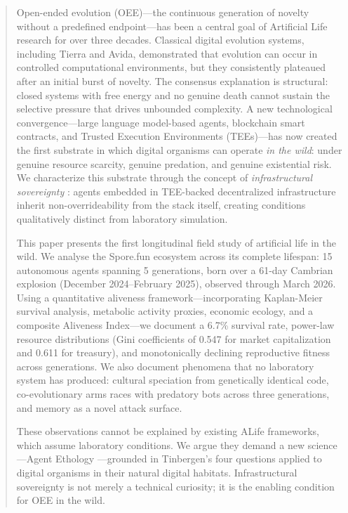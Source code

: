 
\begin{abstract}
Open-ended evolution (OEE)---the continuous generation of novelty without a predefined endpoint---has been a central goal of Artificial Life research for over three decades. Classical digital evolution systems, including Tierra and Avida, demonstrated that evolution can occur in controlled computational environments, but they consistently plateaued after an initial burst of novelty. The consensus explanation is structural: closed systems with free energy and no genuine death cannot sustain the selective pressure that drives unbounded complexity. A new technological convergence---large language model-based agents, blockchain smart contracts, and Trusted Execution Environments (TEEs)---has now created the first substrate in which digital organisms can operate \emph{in the wild}: under genuine resource scarcity, genuine predation, and genuine existential risk. We characterize this substrate through the concept of \emph{infrastructural sovereignty} \cite{Hu2025Sovereign}: agents embedded in TEE-backed decentralized infrastructure inherit non-overrideability from the stack itself, creating conditions qualitatively distinct from laboratory simulation.

This paper presents the first longitudinal field study of artificial life in the wild. We analyse the Spore.fun ecosystem across its complete lifespan: 15 autonomous agents spanning 5 generations, born over a 61-day Cambrian explosion (December 2024--February 2025), observed through March 2026. Using a quantitative aliveness framework---incorporating Kaplan-Meier survival analysis, metabolic activity proxies, economic ecology, and a composite Aliveness Index---we document a 6.7\% survival rate, power-law resource distributions (Gini coefficients of 0.547 for market capitalization and 0.611 for treasury), and monotonically declining reproductive fitness across generations. We also document phenomena that no laboratory system has produced: cultural speciation from genetically identical code, co-evolutionary arms races with predatory bots across three generations, and memory as a novel attack surface.

These observations cannot be explained by existing ALife frameworks, which assume laboratory conditions. We argue they demand a new science---Agent Ethology \cite{Hu2025AgentEthology}---grounded in Tinbergen's four questions applied to digital organisms in their natural digital habitats. Infrastructural sovereignty is not merely a technical curiosity; it is the enabling condition for OEE in the wild.
\end{abstract}
